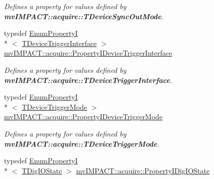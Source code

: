 \begin{DoxyCompactItemize}
\begin{DoxyCompactList}\small\item\em Defines a property for values defined by {\bfseries mv\+I\+M\+P\+A\+C\+T\+::acquire\+::\+T\+Device\+Sync\+Out\+Mode}. \end{DoxyCompactList}\item 
\hypertarget{group___device_specific_interface_gabc51afc4a0e6c169f166ee32bbe45b78}{typedef \hyperlink{classmv_i_m_p_a_c_t_1_1acquire_1_1_enum_property_i}{Enum\+Property\+I}\\*
$<$ \hyperlink{group___device_specific_interface_gac3ca527d649e5a24d75535f263bb5b8a}{T\+Device\+Trigger\+Interface} $>$ \hyperlink{group___device_specific_interface_gabc51afc4a0e6c169f166ee32bbe45b78}{mv\+I\+M\+P\+A\+C\+T\+::acquire\+::\+Property\+I\+Device\+Trigger\+Interface}}\label{group___device_specific_interface_gabc51afc4a0e6c169f166ee32bbe45b78}

\begin{DoxyCompactList}\small\item\em Defines a property for values defined by {\bfseries mv\+I\+M\+P\+A\+C\+T\+::acquire\+::\+T\+Device\+Trigger\+Interface}. \end{DoxyCompactList}\item 
\hypertarget{group___device_specific_interface_gaac7cb59349519ed98d73b8605c3dec64}{typedef \hyperlink{classmv_i_m_p_a_c_t_1_1acquire_1_1_enum_property_i}{Enum\+Property\+I}\\*
$<$ \hyperlink{group___device_specific_interface_ga01d26702f49062f849cb0ce7f517a753}{T\+Device\+Trigger\+Mode} $>$ \hyperlink{group___device_specific_interface_gaac7cb59349519ed98d73b8605c3dec64}{mv\+I\+M\+P\+A\+C\+T\+::acquire\+::\+Property\+I\+Device\+Trigger\+Mode}}\label{group___device_specific_interface_gaac7cb59349519ed98d73b8605c3dec64}

\begin{DoxyCompactList}\small\item\em Defines a property for values defined by {\bfseries mv\+I\+M\+P\+A\+C\+T\+::acquire\+::\+T\+Device\+Trigger\+Mode}. \end{DoxyCompactList}\item 
\hypertarget{group___device_specific_interface_ga26369d2e6b583ee092988de00a839413}{typedef \hyperlink{classmv_i_m_p_a_c_t_1_1acquire_1_1_enum_property_i}{Enum\+Property\+I}\\*
$<$ \hyperlink{group___device_specific_interface_gaa68dd10eeb8003b9f18ac351221a57cc}{T\+Dig\+I\+O\+State} $>$ \hyperlink{group___device_specific_interface_ga26369d2e6b583ee092988de00a839413}{mv\+I\+M\+P\+A\+C\+T\+::acquire\+::\+Property\+I\+Dig\+I\+O\+State}}\label{group___device_specific_interface_ga26369d2e6b583ee092988de00a839413}


\end{DoxyCompactItemize}
